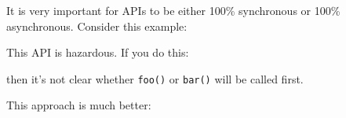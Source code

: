 \begin{Shaded}
\begin{Highlighting}[]
 

  \NormalTok{(}\NormalTok{() \{}
    \NormalTok{();}
  \NormalTok{(}\NormalTok{));}
\NormalTok{\}}

  
\NormalTok{();}

\end{Highlighting}
\end{Shaded}

It is very important for APIs to be either 100\% synchronous or 100\%
asynchronous. Consider this example:

\begin{Shaded}
\begin{Highlighting}[]
 
   
    \NormalTok{;}
  \NormalTok{\}}

  \NormalTok{(}
\NormalTok{\}}
\end{Highlighting}
\end{Shaded}

This API is hazardous. If you do this:

\begin{Shaded}
\begin{Highlighting}[]
\NormalTok{, }\NormalTok{() \{}
\NormalTok{\});}
\end{Highlighting}
\end{Shaded}

then it's not clear whether \texttt{foo()} or \texttt{bar()} will be
called first.

This approach is much better:

\begin{Shaded}
\begin{Highlighting}[]
 
   
    \NormalTok{;}
  \NormalTok{\}}

  \NormalTok{(}
\NormalTok{\}}
\end{Highlighting}
\end{Shaded}


